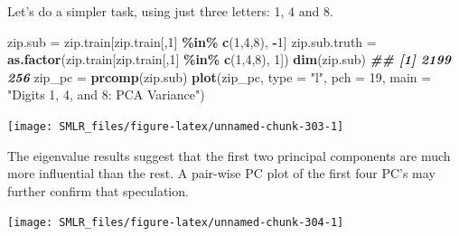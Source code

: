 \documentclass[
]{book}
\newenvironment{Shaded}{\begin{snugshade}}{\end{snugshade}}
\newcommand{\AttributeTok}[1]{\textcolor[rgb]{0.13,0.29,0.53}{#1}}
\newcommand{\DecValTok}[1]{\textcolor[rgb]{0.00,0.00,0.81}{#1}}
\newcommand{\DocumentationTok}[1]{\textcolor[rgb]{0.56,0.35,0.01}{\textbf{\textit{#1}}}}
\newcommand{\FunctionTok}[1]{\textcolor[rgb]{0.13,0.29,0.53}{\textbf{#1}}}
\newcommand{\NormalTok}[1]{#1}
\newcommand{\OtherTok}[1]{\textcolor[rgb]{0.56,0.35,0.01}{#1}}
\newcommand{\SpecialCharTok}[1]{\textcolor[rgb]{0.81,0.36,0.00}{\textbf{#1}}}
\newcommand{\StringTok}[1]{\textcolor[rgb]{0.31,0.60,0.02}{#1}}
\theoremstyle{definition}
\theoremstyle{definition}
\theoremstyle{definition}
\theoremstyle{definition}
\theoremstyle{remark}
\begin{document}
Let's do a simpler task, using just three letters: 1, 4 and 8.

\begin{Shaded}
\begin{Highlighting}[]
\NormalTok{    zip.sub }\OtherTok{=}\NormalTok{ zip.train[zip.train[,}\DecValTok{1}\NormalTok{] }\SpecialCharTok{\%in\%} \FunctionTok{c}\NormalTok{(}\DecValTok{1}\NormalTok{,}\DecValTok{4}\NormalTok{,}\DecValTok{8}\NormalTok{), }\SpecialCharTok{{-}}\DecValTok{1}\NormalTok{]}
\NormalTok{    zip.sub.truth }\OtherTok{=} \FunctionTok{as.factor}\NormalTok{(zip.train[zip.train[,}\DecValTok{1}\NormalTok{] }\SpecialCharTok{\%in\%} \FunctionTok{c}\NormalTok{(}\DecValTok{1}\NormalTok{,}\DecValTok{4}\NormalTok{,}\DecValTok{8}\NormalTok{), }\DecValTok{1}\NormalTok{])}
    \FunctionTok{dim}\NormalTok{(zip.sub)}
\DocumentationTok{\#\# [1] 2199  256}
\NormalTok{    zip\_pc }\OtherTok{=} \FunctionTok{prcomp}\NormalTok{(zip.sub)}
    \FunctionTok{plot}\NormalTok{(zip\_pc, }\AttributeTok{type =} \StringTok{"l"}\NormalTok{, }\AttributeTok{pch =} \DecValTok{19}\NormalTok{, }\AttributeTok{main =} \StringTok{"Digits 1, 4, and 8: PCA Variance"}\NormalTok{)}
\end{Highlighting}
\end{Shaded}

\begin{center}\texttt{[image: SMLR\_files/figure-latex/unnamed-chunk-303-1]} \end{center}

The eigenvalue results suggest that the first two principal components are much more influential than the rest. A pair-wise PC plot of the first four PC's may further confirm that speculation.

\begin{Shaded}
\end{Shaded}

\begin{center}\texttt{[image: SMLR\_files/figure-latex/unnamed-chunk-304-1]} \end{center}
\end{document}
